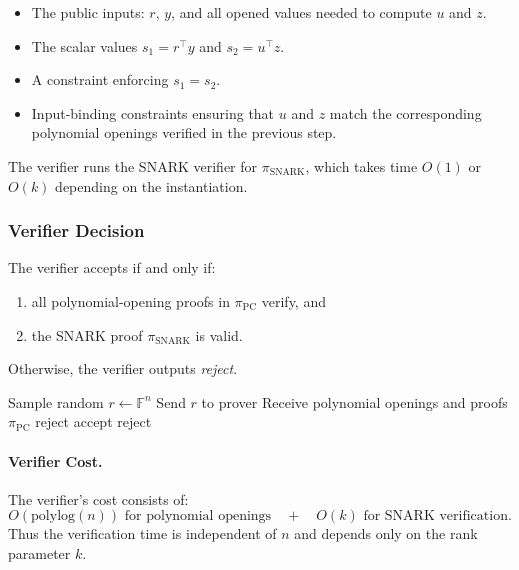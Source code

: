 \documentclass[11pt]{article}
\begin{document}
\begin{itemize}
  \item The public inputs: $r$, $y$, and all opened values needed to 
        compute $u$ and $z$.
  \item The scalar values $s_1 = r^\top y$ and $s_2 = u^\top z$.
  \item A constraint enforcing $s_1 = s_2$.
  \item Input-binding constraints ensuring that $u$ and $z$ match the 
        corresponding polynomial openings verified in the previous step.
\end{itemize}

The verifier runs the SNARK verifier for $\pi_{\mathrm{SNARK}}$, which 
takes time $O(1)$ or $O(k)$ depending on the instantiation.

\subsubsection{Verifier Decision}

The verifier accepts if and only if:
\begin{enumerate}
  \item all polynomial-opening proofs in $\pi_{\mathrm{PC}}$ verify, and
  \item the SNARK proof $\pi_{\mathrm{SNARK}}$ is valid.
\end{enumerate}

Otherwise, the verifier outputs \emph{reject}.

\begin{algorithm}[t]
\caption{Verifier Algorithm}
\begin{algorithmic}[1]
\State Sample random $r \leftarrow \mathbb{F}^n$
\State Send $r$ to prover
\State Receive polynomial openings and proofs $\pi_{\mathrm{PC}}$
 \Return reject
\EndIf
{}
    \Return accept
\Else
    \Return reject
\EndIf
\end{algorithmic}
\end{algorithm}

\paragraph{Verifier Cost.}
The verifier’s cost consists of:
\[
  O(\text{polylog}(n)) \text{ for polynomial openings} \quad+\quad O(k)
  \text{ for SNARK verification}.
\]
Thus the verification time is independent of $n$ and depends only on the
rank parameter $k$.
\end{document}
